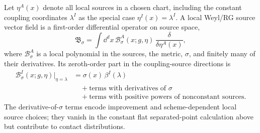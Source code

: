 Let \(\eta^A(x)\) denote all local sources in a chosen chart, including the
constant coupling coordinates \(\lambda^I\) as the special case
\(\eta^I(x)=\lambda^I\).  A local Weyl/RG source vector field is a first-order
differential operator on source space,
\[
  \mathfrak B_\sigma
  =
  \int\dd^d x\,
  \mathcal B^A_\sigma(x;g,\eta)\,
  \frac{\delta}{\delta\eta^A(x)},
\]
where \(\mathcal B^A_\sigma\) is a local polynomial in the sources, the metric,
\(\sigma\), and finitely many of their derivatives.  Its zeroth-order part in
the coupling-source directions is
\[
  \begin{aligned}
  \mathcal B^I_\sigma(x;g,\eta)\big|_{\eta=\lambda}
  &=
  \sigma(x)\,\beta^I(\lambda)
  \\
  &\quad+
  \text{terms with derivatives of }\sigma
  \\
  &\quad+
  \text{terms with positive powers of nonconstant sources}.
  \end{aligned}
\]
The derivative-of-\(\sigma\) terms encode improvement and scheme-dependent local
source choices; they vanish in the constant flat separated-point calculation
above but contribute to contact distributions.

